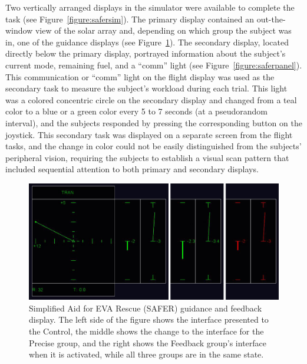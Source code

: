 Two vertically arranged displays in the simulator were available to complete the task (see Figure~\ref{figure:safersim}).
The primary display contained an out-the-window view of the solar array and, depending on which group the subject was in, one of the guidance displays (see Figure~\ref{figure:safergroups}).
The secondary display, located directly below the primary display, portrayed information about the subject's current mode, remaining fuel, and a ``comm'' light (see Figure~\ref{figure:saferpanel}).
This communication or ``comm'' light on the flight display was used as the secondary task to measure the subject's workload during each trial.
This light was a colored concentric circle on the secondary display and changed from a teal color to a blue or a green color every 5 to 7 seconds (at a pseudorandom interval), and the subjects responded by pressing the corresponding button on the joystick.
This secondary task was displayed on a separate screen from the flight tasks, and the change in color could not be easily distinguished from the subjects' peripheral vision, requiring the subjects to establish a visual scan pattern that included sequential attention to both primary and secondary displays.

\begin{figure}[tb!]
    \begin{center}
        \includegraphics[width=\linewidth]{figures/Introduction/SAFERGroups.png}
        \caption[Simplified Aid for EVA Rescue (SAFER) guidance and feedback display]{Simplified Aid for EVA Rescue (SAFER) guidance and feedback display. The left side of the figure shows the interface presented to the Control, the middle shows the change to the interface for the Precise group, and the right shows the Feedback group's interface when it is activated, while all three groups are in the same state.}
        \label{figure:safergroups}
    \end{center}
\end{figure}

